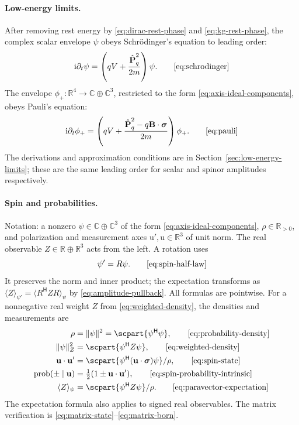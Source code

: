 \documentclass[11pt]{article}
\newcommand{\pv}[1]{{#1}}
\newcommand{\pvGreek}[1]{{#1}}
\newcommand{\vstyle}[1]{{\bm{\mathrm{#1}}}}
\newcommand{\pR}{\pv{R}}
\newcommand{\pZ}{\pv{Z}}
\newcommand{\pvphi}{\pvGreek{\phi}}
\newcommand{\pvpsi}{\pvGreek{\psi}}
\numberwithin{equation}{section}
\newcommand{\R}{\mathbb{R}}
\newcommand{\C}{\mathbb{C}}
\newcommand{\ii}{\mathrm{i}}
\newcommand{\dotprod}{\cdot}
\newcommand{\bsig}{\vstyle{\sigma}}
\newcommand{\bu}{\vstyle{u}}
\newcommand{\bBf}{\vstyle{B}}
\newcommand{\bp}{\vstyle{P}}
\newcommand{\hbpq}{\hat{\bp}_q}
\begin{document}
\paragraph{Low-energy limits.}
After removing rest energy by \eqref{eq:dirac-rest-phase} and
\eqref{eq:kg-rest-phase}, the complex scalar envelope $\psi$ obeys
Schr\"odinger's equation to leading order:
\begin{equation*}
 \ii\partial_t\psi=\left(qV+\frac{\hbpq^2}{2m}\right)\psi.
 \tag*{\eqref{eq:schrodinger}}
\end{equation*}
The envelope $\pvphi_+:\R^4\to\C\oplus\C^3$, restricted to the form
\eqref{eq:axis-ideal-components}, obeys Pauli's equation:
\begin{equation*}
 \ii\partial_t\pvphi_+=\left(qV+
 \frac{\hbpq^2-q\bBf\dotprod\bsig}{2m}\right)\pvphi_+.
 \tag*{\eqref{eq:pauli}}
\end{equation*}
The derivations and approximation conditions are in
Section~\ref{sec:low-energy-limits}; these are the same leading order
for scalar and spinor amplitudes respectively.

\paragraph{Spin and probabilities.}
Notation: a nonzero $\pvpsi\in\C\oplus\C^3$ of the form
\eqref{eq:axis-ideal-components}, $\rho\in\R_{>0}$,
and polarization and measurement axes $\bu',\bu\in\R^3$ of unit norm.
The real observable $\pZ\in\R\oplus\R^3$ acts from the left.  A rotation uses
\begin{equation*}
 \pvpsi'=\pR\pvpsi.
 \tag*{\eqref{eq:spin-half-law}}
\end{equation*}
It preserves the norm and inner product; the expectation transforms as
$\langle \pZ\rangle_{\pvpsi'}=\langle \pR^{\mathsf H}\pZ \pR\rangle_\pvpsi$ by
\eqref{eq:amplitude-pullback}.
All formulas are pointwise.  For a nonnegative real weight $\pZ$
from \eqref{eq:weighted-density}, the densities and measurements are
\begin{align*}
 \rho&=\lVert\pvpsi\rVert^2=\scpart{\pvpsi^{\mathsf H}\pvpsi},
   \tag*{\eqref{eq:probability-density}}\\
 \lVert\pvpsi\rVert_\pZ^2&=\scpart{\pvpsi^{\mathsf H}\pZ\pvpsi},
   \tag*{\eqref{eq:weighted-density}}\\
 \bu\dotprod\bu'&=\scpart{\pvpsi^{\mathsf H}(\bu\dotprod\bsig)\pvpsi}/\rho,
   \tag*{\eqref{eq:spin-state}}\\
 \mathrm{prob}(\pm\mid\bu)&=\tfrac12(1\pm\bu\dotprod\bu'),
   \tag*{\eqref{eq:spin-probability-intrinsic}}\\
 \langle \pZ\rangle_\pvpsi&=\scpart{\pvpsi^{\mathsf H}\pZ\pvpsi}/\rho.
   \tag*{\eqref{eq:paravector-expectation}}
\end{align*}
The expectation formula also applies to signed real observables.
The matrix verification is \eqref{eq:matrix-state}--\eqref{eq:matrix-born}.
\end{document}

